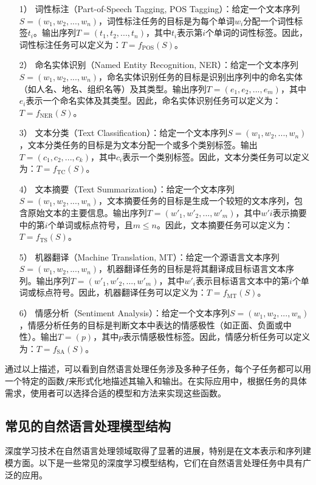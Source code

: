 \begin{itemize}
	\item [1）]
	词性标注（Part-of-Speech Tagging, POS Tagging）：给定一个文本序列$S=(w_1, w_2, ..., w_n)$，词性标注任务的目标是为每个单词$w_i$分配一个词性标签$t_i$。输出序列$T=(t_1, t_2, ..., t_n)$，其中$t_i$表示第$i$个单词的词性标签。因此，词性标注任务可以定义为：$T = f_{\text{POS}}(S)$。
	\item [2）]
	命名实体识别（Named Entity Recognition, NER）：给定一个文本序列$S=(w_1, w_2, ..., w_n)$，命名实体识别任务的目标是识别出序列中的命名实体（如人名、地名、组织名等）及其类型。输出序列$T=(e_1, e_2, ..., e_m)$，其中$e_i$表示一个命名实体及其类型。因此，命名实体识别任务可以定义为：$T = f_{\text{NER}}(S)$。
	\item [3）]
	文本分类（Text Classification）：给定一个文本序列$S=(w_1, w_2, ..., w_n)$，文本分类任务的目标是为文本分配一个或多个类别标签。输出$T = (c_1, c_2, ..., c_k)$，其中$c_i$表示一个类别标签。因此，文本分类任务可以定义为：$T = f_{\text{TC}}(S)$。
	\item [4）]
	文本摘要（Text Summarization）：给定一个文本序列$S=(w_1, w_2, ..., w_n)$，文本摘要任务的目标是生成一个较短的文本序列，包含原始文本的主要信息。输出序列$T=(w'_1, w'_2, ..., w'_m)$，其中$w'i$表示摘要中的第$i$个单词或标点符号，且$m \leq n$。因此，文本摘要任务可以定义为：$T = f_{\text{TS}}(S)$。
	\item [5）]
	机器翻译（Machine Translation, MT）：给定一个源语言文本序列$S=(w_1, w_2, ..., w_n)$，机器翻译任务的目标是将其翻译成目标语言文本序列。输出序列$T=(w'_1, w'_2, ..., w'_m)$，其中$w'_i$表示目标语言文本中的第$i$个单词或标点符号。因此，机器翻译任务可以定义为：$T = f_{\text{MT}}(S)$。
	\item [6）]
	情感分析（Sentiment Analysis）：给定一个文本序列$S=(w_1, w_2, ..., w_n)$，情感分析任务的目标是判断文本中表达的情感极性（如正面、负面或中性）。输出$T = (p)$，其中$p$表示情感极性标签。因此，情感分析任务可以定义为：$T = f_{\text{SA}}(S)$。
\end{itemize}

通过以上描述，可以看到自然语言处理任务涉及多种子任务，每个子任务都可以用一个特定的函数$f$来形式化地描述其输入和输出。在实际应用中，根据任务的具体需求，使用者可以选择合适的模型和方法来实现这些函数。


\subsection{常见的自然语言处理模型结构}

深度学习技术在自然语言处理领域取得了显著的进展，特别是在文本表示和序列建模方面。以下是一些常见的深度学习模型结构，它们在自然语言处理任务中具有广泛的应用。

